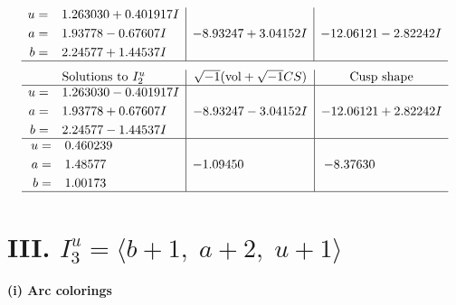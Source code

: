 \documentclass[1p]{elsarticle_modified}
\theoremstyle{definition}
\newcommand{\I}{\sqrt{-1}}
\begin{document}
$$\begin{array}{c|c|c}
\begin{aligned}
u &= \phantom{-}1.263030 + 0.401917 I \\
a &= \phantom{-}1.93778 - 0.67607 I \\
b &= \phantom{-}2.24577 + 1.44537 I\end{aligned}
 & -8.93247 + 3.04152 I & -12.06121 - 2.82242 I\\
 \hline 
 \end{array}$$\newpage$$\begin{array}{c|c|c}  
\text{Solutions to }I^u_{2}& \I (\text{vol} + \sqrt{-1}CS) & \text{Cusp shape}\\
 \hline 
\begin{aligned}
u &= \phantom{-}1.263030 - 0.401917 I \\
a &= \phantom{-}1.93778 + 0.67607 I \\
b &= \phantom{-}2.24577 - 1.44537 I\end{aligned}
 & -8.93247 - 3.04152 I & -12.06121 + 2.82242 I \\ \hline\begin{aligned}
u &= \phantom{-}0.460239\phantom{ +0.000000I} \\
a &= \phantom{-}1.48577\phantom{ +0.000000I} \\
b &= \phantom{-}1.00173\phantom{ +0.000000I}\end{aligned}
 & -1.09450\phantom{ +0.000000I} & -8.37630\phantom{ +0.000000I}\\
 \hline 
 \end{array}$$\newpage\newpage\renewcommand{\arraystretch}{1}
\centering \section*{III. $I^u_{3}= \langle b+1,\;a+2,\;u+1 \rangle$}
\flushleft \textbf{(i) Arc colorings}\\
\end{document}
